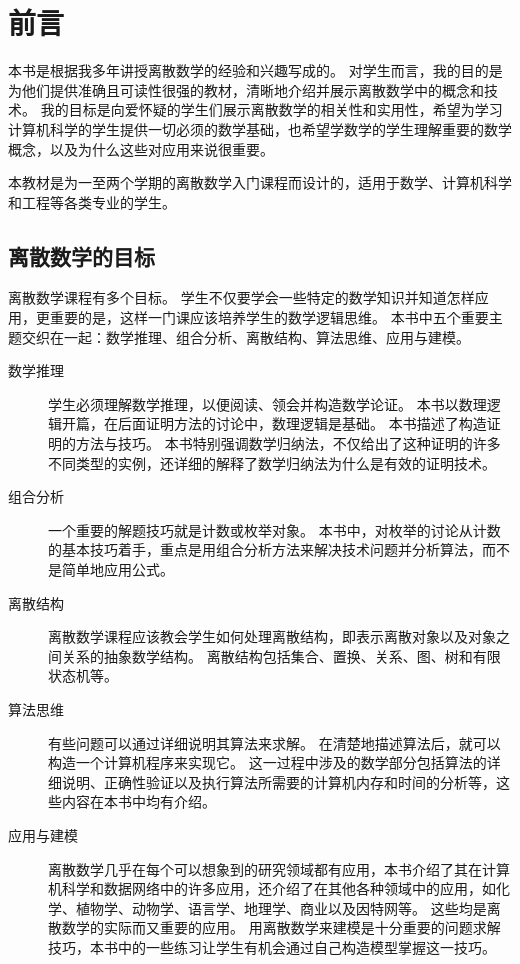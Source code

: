 \chapter{前言}
{
    本书是根据我多年讲授离散数学的经验和兴趣写成的。
    对学生而言，我的目的是为他们提供准确且可读性很强的教材，清晰地介绍并展示离散数学中的概念和技术。
    我的目标是向爱怀疑的学生们展示离散数学的相关性和实用性，希望为学习计算机科学的学生提供一切必须的数学基础，也希望学数学的学生理解重要的数学概念，以及为什么这些对应用来说很重要。

    本教材是为一至两个学期的离散数学入门课程而设计的，适用于数学、计算机科学和工程等各类专业的学生。

    \section{离散数学的目标}
    {
        离散数学课程有多个目标。
        学生不仅要学会一些特定的数学知识并知道怎样应用，更重要的是，这样一门课应该培养学生的数学逻辑思维。
        本书中五个重要主题交织在一起：数学推理、组合分析、离散结构、算法思维、应用与建模。

        \begin{description}
            \item[数学推理]
            {
                学生必须理解数学推理，以便阅读、领会并构造数学论证。
                本书以数理逻辑开篇，在后面证明方法的讨论中，数理逻辑是基础。
                本书描述了构造证明的方法与技巧。
                本书特别强调数学归纳法，不仅给出了这种证明的许多不同类型的实例，还详细的解释了数学归纳法为什么是有效的证明技术。
            }
            \item[组合分析]
            {
                一个重要的解题技巧就是计数或枚举对象。
                本书中，对枚举的讨论从计数的基本技巧着手，重点是用组合分析方法来解决技术问题并分析算法，而不是简单地应用公式。
            }
            \item[离散结构]
            {
                离散数学课程应该教会学生如何处理离散结构，即表示离散对象以及对象之间关系的抽象数学结构。
                离散结构包括集合、置换、关系、图、树和有限状态机等。
            }
            \item[算法思维]
            {
                有些问题可以通过详细说明其算法来求解。
                在清楚地描述算法后，就可以构造一个计算机程序来实现它。
                这一过程中涉及的数学部分包括算法的详细说明、正确性验证以及执行算法所需要的计算机内存和时间的分析等，这些内容在本书中均有介绍。
            }
            \item[应用与建模]
            {
                离散数学几乎在每个可以想象到的研究领域都有应用，本书介绍了其在计算机科学和数据网络中的许多应用，还介绍了在其他各种领域中的应用，如化学、植物学、动物学、语言学、地理学、商业以及因特网等。
                这些均是离散数学的实际而又重要的应用。
                用离散数学来建模是十分重要的问题求解技巧，本书中的一些练习让学生有机会通过自己构造模型掌握这一技巧。
            }
        \end{description}
    }

}
